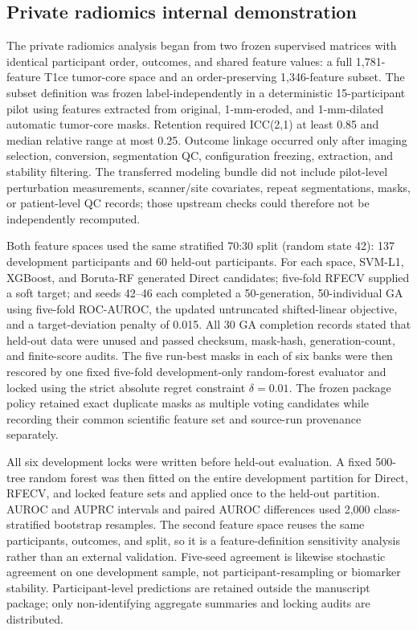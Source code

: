 \subsection{Private radiomics internal demonstration}

The private radiomics analysis began from two frozen supervised matrices with identical participant order, outcomes, and shared feature values: a full 1,781-feature T1ce tumor-core space and an order-preserving 1,346-feature subset. The subset definition was frozen label-independently in a deterministic 15-participant pilot using features extracted from original, 1-mm-eroded, and 1-mm-dilated automatic tumor-core masks. Retention required ICC(2,1) at least 0.85 and median relative range at most 0.25. Outcome linkage occurred only after imaging selection, conversion, segmentation QC, configuration freezing, extraction, and stability filtering. The transferred modeling bundle did not include pilot-level perturbation measurements, scanner/site covariates, repeat segmentations, masks, or patient-level QC records; those upstream checks could therefore not be independently recomputed.

Both feature spaces used the same stratified 70:30 split (random state 42): 137 development participants and 60 held-out participants. For each space, SVM-L1, XGBoost, and Boruta-RF generated Direct candidates; five-fold RFECV supplied a soft target; and seeds 42--46 each completed a 50-generation, 50-individual GA using five-fold ROC-AUROC, the updated untruncated shifted-linear objective, and a target-deviation penalty of 0.015. All 30 GA completion records stated that held-out data were unused and passed checksum, mask-hash, generation-count, and finite-score audits. The five run-best masks in each of six banks were then rescored by one fixed five-fold development-only random-forest evaluator and locked using the strict absolute regret constraint $\delta=0.01$. The frozen package policy retained exact duplicate masks as multiple voting candidates while recording their common scientific feature set and source-run provenance separately.

All six development locks were written before held-out evaluation. A fixed 500-tree random forest was then fitted on the entire development partition for Direct, RFECV, and locked feature sets and applied once to the held-out partition. AUROC and AUPRC intervals and paired AUROC differences used 2,000 class-stratified bootstrap resamples. The second feature space reuses the same participants, outcomes, and split, so it is a feature-definition sensitivity analysis rather than an external validation. Five-seed agreement is likewise stochastic agreement on one development sample, not participant-resampling or biomarker stability. Participant-level predictions are retained outside the manuscript package; only non-identifying aggregate summaries and locking audits are distributed.

